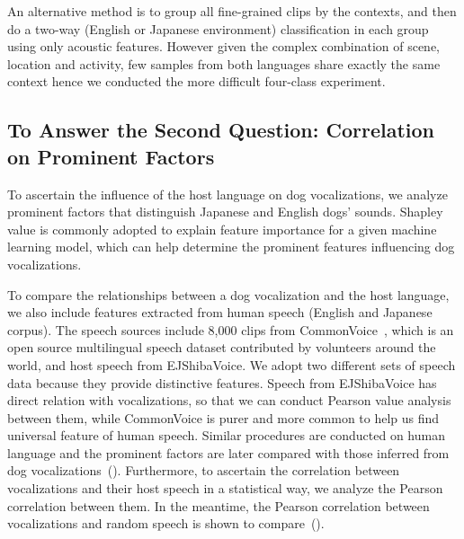 An alternative method is to group all fine-grained  clips by the contexts, and then
do a two-way (English or Japanese environment) classification in each group using only 
acoustic features.  However given the complex combination of  scene, location and activity, few samples from both languages share exactly the same context hence we conducted the more difficult four-class experiment. 

\subsection{To Answer the Second Question: Correlation on Prominent Factors}
To ascertain the influence of the host language on dog vocalizations, we analyze prominent factors 
that distinguish Japanese and English dogs' sounds. Shapley value is commonly adopted 
to explain feature importance for a given machine learning model, which can help 
determine the prominent features influencing dog vocalizations. %




To compare the relationships between a dog vocalization and the host language, 
we also include features extracted from human speech (English and Japanese corpus). 
The speech sources include 8,000 clips from CommonVoice~\cite{ardila2019common}, 
which is an open source multilingual speech dataset contributed by volunteers around 
the world, and host speech from EJShibaVoice. We adopt two different sets of speech data 
because they provide distinctive features. 
Speech from EJShibaVoice has direct relation with vocalizations, 
so that we can conduct Pearson value analysis between them, 
while CommonVoice is purer and more common to help us find universal 
feature of human speech. Similar procedures are conducted on human language 
and the prominent factors are later compared with those inferred 
from dog vocalizations~().
Furthermore, to ascertain the correlation between vocalizations and their host speech in a statistical way, we analyze the Pearson correlation between them. In the meantime, the Pearson correlation between vocalizations and random speech is shown to compare~().
